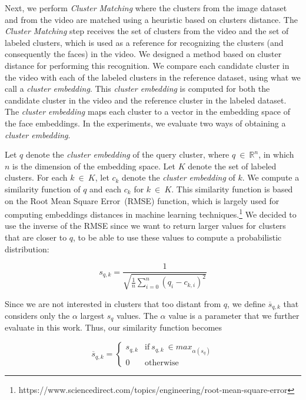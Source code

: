 Next, we perform \emph{Cluster Matching} where the clusters from the image dataset and from the video are matched using a heuristic based on clusters distance.
%
The \textit{Cluster Matching} step receives the set of clusters from the video and the set of labeled clusters, which is used as a reference for recognizing the clusters (and consequently the faces) in the video.
We designed a method based on cluster distance for performing this recognition.
We compare each candidate cluster in the video with each of the labeled clusters in the reference dataset, using what we call a \emph{cluster embedding}. This \emph{cluster embedding} is computed for both the candidate cluster in the video and the reference cluster in the labeled dataset.
The \emph{cluster embedding} maps each cluster to a vector in the embedding space of the face embeddings.
In the experiments, we evaluate two ways of obtaining a \emph{cluster embedding}.

Let $q$ denote the \emph{cluster embedding} of the query cluster, where $q~\in~\mathbb{R}^{n}$, in which $n$ is the dimension of the embedding space.
%
Let $K$ denote the set of labeled clusters. For each $k~\in~K$, let $c_k$ denote the \emph{cluster embedding} of $k$. 
%
We compute a similarity function of $q$ and each $c_k$ for $k~\in~K$. 
This similarity function is based on the Root Mean Square Error~(RMSE) function, which is largely used for computing embeddings distances in machine learning techniques.\footnote{https://www.sciencedirect.com/topics/engineering/root-mean-square-error}
We decided to use the inverse of the RMSE since we want to return larger values for clusters that are closer to $q$, to be able to use these values to compute a probabilistic distribution:

\begin{equation}
\label{equation:similarity_raw}
    s_{q,k} = \frac{1}{\sqrt{\frac{1}{n}\sum_{i=0}^{n}{(q_i-c_{k,i})^2}}}
\end{equation}

Since we are not interested in clusters that too distant from $q$, we define $\overline{s}_{q,k}$ that considers only the $\alpha$ largest $s_q$ values. The $\alpha$ value is a parameter that we further evaluate in this work. 
Thus, our similarity function becomes

\begin{equation}
\label{equation:similarity}
    \overline{s}_{q,k} = \begin{cases}s_{q,k} & \text{if}~s_{q,k}~\in max_{\alpha(s_q)}\\0 & \text{otherwise}\end{cases}
\end{equation}

